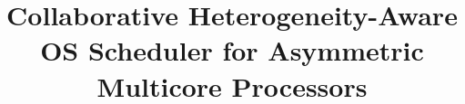 \documentclass[10pt,journal,compsoc]{IEEEtran}
\begin{document}
\title{Collaborative Heterogeneity-Aware OS Scheduler for Asymmetric Multicore Processors}
%
%
%
%
\end{document}
